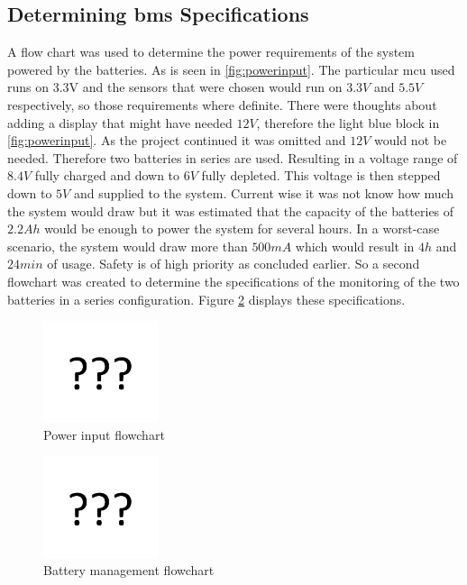 \subsection{Determining \gls{bms} Specifications}
A flow chart was used to determine the power requirements of the system powered by the batteries. As is seen in \autoref{fig:powerinput}. The particular \gls{mcu} used runs on 3.3V and the sensors that were chosen would run on $3.3V$ and $5.5V$ respectively, so those requirements where definite. There were thoughts about adding a display that might have needed $12V$, therefore the light blue block in \autoref{fig:powerinput}. As the project continued it was omitted and $12V$ would not be needed. Therefore two batteries in series are used. Resulting in a voltage range of $8.4V$ fully charged and down to $6V$ fully depleted. This voltage is then stepped down to $5V$ and supplied to the system.
Current wise it was not know how much the system would draw but it was estimated that the capacity of the batteries of $2.2Ah$ would be enough to power the system for several hours.
In a worst-case scenario, the system would draw more than $500mA$ which would result in $4h$ and $24min$ of usage.
Safety is of high priority as concluded earlier. So a second flowchart was created to determine the specifications of the monitoring of the two batteries in a series configuration. Figure \ref{fig:battery} displays these specifications.

\begin{figure}[H]
	\centering
	\includegraphics[width=0.3\textwidth]{Figures/missing.png} %
	\caption{Power input flowchart}
	\label{fig:powerinput}
\end{figure}

\begin{figure}[H]
	\centering
	\includegraphics[width=0.3\textwidth]{Figures/missing.png} %
	\caption{Battery management flowchart}
	\label{fig:battery}
\end{figure}


